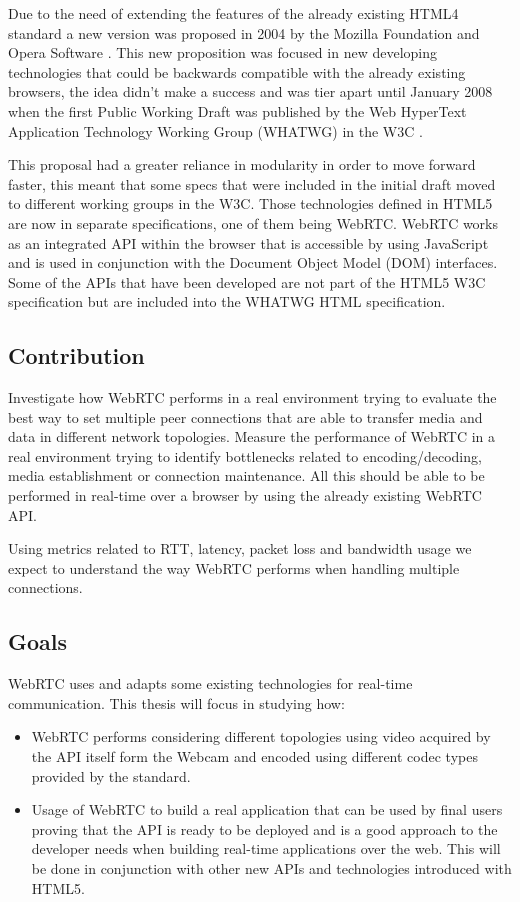 Due to the need of extending the features of the already existing HTML4 standard a new version was proposed in 2004 by the Mozilla Foundation and Opera Software \cite{initialHTML5proposition}. This new proposition was focused in new developing technologies that could be backwards compatible with the already existing browsers, the idea didn't make a success and was tier apart until January 2008 when the first Public Working Draft was published by the Web HyperText Application Technology Working Group (WHATWG) in the W3C \cite{firstHTML5draft}.

This proposal had a greater reliance in modularity in order to move forward faster, this meant that some specs that were included in the initial draft moved to different working groups in the W3C. Those technologies defined in HTML5 are now in separate specifications, one of them being WebRTC. WebRTC works as an integrated API within the browser that is accessible by using JavaScript and is used in conjunction with the Document Object Model (DOM) interfaces. Some of the APIs that have been developed are not part of the HTML5 W3C specification but are included into the WHATWG HTML specification.

\subsection{Contribution}

Investigate how WebRTC performs in a real environment trying to evaluate the best way to set multiple peer connections that are able to transfer media and data in different network topologies. Measure the performance of WebRTC in a real environment trying to identify bottlenecks related to encoding/decoding, media establishment or connection maintenance. All this should be able to be performed in real-time over a browser by using the already existing WebRTC API.

Using metrics related to RTT, latency, packet loss and bandwidth usage we expect to understand the way WebRTC performs when handling multiple connections.

\subsection{Goals}

WebRTC uses and adapts some existing technologies for real-time communication. This thesis will focus in studying how:

\begin{itemize}
	\item WebRTC performs considering different topologies using video acquired by the API itself form the Webcam and encoded using different codec types provided by the standard.

	\item Usage of WebRTC to build a real application that can be used by final users proving that the API is ready to be deployed and is a good approach to the developer needs when building real-time applications over the web. This will be done in conjunction with other new APIs and technologies introduced with HTML5.
\end{itemize}

